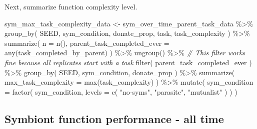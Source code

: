 \documentclass[
]{book}
\newenvironment{Shaded}{\begin{snugshade}}{\end{snugshade}}
\newcommand{\AttributeTok}[1]{\textcolor[rgb]{0.77,0.63,0.00}{#1}}
\newcommand{\CommentTok}[1]{\textcolor[rgb]{0.56,0.35,0.01}{\textit{#1}}}
\newcommand{\FunctionTok}[1]{\textcolor[rgb]{0.00,0.00,0.00}{#1}}
\newcommand{\NormalTok}[1]{#1}
\newcommand{\OtherTok}[1]{\textcolor[rgb]{0.56,0.35,0.01}{#1}}
\newcommand{\SpecialCharTok}[1]{\textcolor[rgb]{0.00,0.00,0.00}{#1}}
\newcommand{\StringTok}[1]{\textcolor[rgb]{0.31,0.60,0.02}{#1}}
\begin{document}
Next, summarize function complexity level.

\begin{Shaded}
\begin{Highlighting}[]
\NormalTok{sym\_max\_task\_complexity\_data }\OtherTok{\textless{}{-}}\NormalTok{ sym\_over\_time\_parent\_task\_data }\SpecialCharTok{\%\textgreater{}\%}
  \FunctionTok{group\_by}\NormalTok{(}
\NormalTok{    SEED,}
\NormalTok{    sym\_condition,}
\NormalTok{    donate\_prop,}
\NormalTok{    task,}
\NormalTok{    task\_complexity}
\NormalTok{  ) }\SpecialCharTok{\%\textgreater{}\%}
  \FunctionTok{summarize}\NormalTok{(}
    \AttributeTok{n =} \FunctionTok{n}\NormalTok{(),}
    \AttributeTok{parent\_task\_completed\_ever =} \FunctionTok{any}\NormalTok{(task\_completed\_by\_parent)}
\NormalTok{  ) }\SpecialCharTok{\%\textgreater{}\%}
  \FunctionTok{ungroup}\NormalTok{() }\SpecialCharTok{\%\textgreater{}\%}
  \CommentTok{\# This filter works fine because all replicates start with a task}
  \FunctionTok{filter}\NormalTok{(}
\NormalTok{    parent\_task\_completed\_ever}
\NormalTok{  ) }\SpecialCharTok{\%\textgreater{}\%}
  \FunctionTok{group\_by}\NormalTok{(}
\NormalTok{    SEED,}
\NormalTok{    sym\_condition,}
\NormalTok{    donate\_prop}
\NormalTok{  ) }\SpecialCharTok{\%\textgreater{}\%}
  \FunctionTok{summarize}\NormalTok{(}
    \AttributeTok{max\_task\_complexity =} \FunctionTok{max}\NormalTok{(task\_complexity)}
\NormalTok{  ) }\SpecialCharTok{\%\textgreater{}\%}
  \FunctionTok{mutate}\NormalTok{(}
    \AttributeTok{sym\_condition =} \FunctionTok{factor}\NormalTok{(}
\NormalTok{      sym\_condition,}
      \AttributeTok{levels =} \FunctionTok{c}\NormalTok{(}
        \StringTok{"no{-}syms"}\NormalTok{,}
        \StringTok{"parasite"}\NormalTok{,}
        \StringTok{"mutualist"}
\NormalTok{      )}
\NormalTok{    )}
\NormalTok{  )}
\end{Highlighting}
\end{Shaded}

\hypertarget{symbiont-function-performance---all-time-3}{%
\subsection{Symbiont function performance - all time}\label{symbiont-function-performance---all-time-3}}
\end{document}
